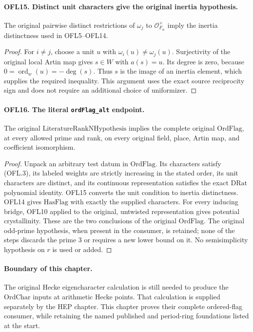 \documentclass[11pt,a4paper]{article}
\numberwithin{equation}{section}
\theoremstyle{remark}\newtheorem{remark}[theorem]{Remark}
\begin{document}
\paragraph{OFL15. Distinct unit characters give the original inertia hypothesis.}
\label{claim:OFL15}
The original pairwise distinct restrictions of \(\omega_j\) to
\(\mathcal O_{F_w}^\times\) imply the inertia distinctness used
in OFL5--OFL14.
\begin{proof}
For \(i\ne j\), choose a unit \(u\) with
\(\omega_i(u)\ne\omega_j(u)\).  Surjectivity of the
original local Artin map gives \(s\in W\) with \(a(s)=u\).
Its degree is zero, because
\(0=\operatorname{ord}_w(u)=-\deg(s)\).  Thus \(s\)
is the image of an inertia element, which supplies the required
inequality.  This argument uses the exact source reciprocity
sign and does not require an additional choice of uniformizer.
\end{proof}

\paragraph{OFL16. The literal \texttt{ord\allowbreak Flag\_\allowbreak alt} endpoint.}
\label{claim:OFL16}
The original \(\mathrm{LiteratureRankNHypothesis}\) implies
the complete original \(\mathrm{OrdFlag}\), at every allowed
prime and rank, on every original field, place, Artin map, and
coefficient isomorphism.
\begin{proof}
Unpack an arbitrary test datum in \(\mathrm{OrdFlag}\).
Its characters satisfy (OFL.3), its labeled weights are strictly
increasing in the stated order, its unit characters are distinct,
and its continuous representation satisfies the exact
\(\mathrm{DRat}\) polynomial identity.  OFL15 converts the
unit condition to inertia distinctness.  OFL14 gives
\(\mathrm{HasFlag}\) with exactly the supplied characters.
For every inducing bridge, OFL10 applied to the original,
untwisted representation gives potential crystallinity.  These
are the two conclusions of the original \(\mathrm{OrdFlag}\).
The original odd-prime hypothesis, when present in the consumer,
is retained; none of the steps discards the prime \(3\) or
requires a new lower bound on it.  No semisimplicity hypothesis
on \(r\) is used or added.
\end{proof}

\paragraph{Boundary of this chapter.}
The original Hecke eigencharacter calculation is still needed to
produce the \(\mathrm{OrdChar}\) inputs at arithmetic Hecke
points.  That calculation is supplied separately by the HEP
chapter.  This chapter proves their complete ordered-flag consumer,
while retaining the named published and period-ring foundations
listed at the start.
\end{document}
